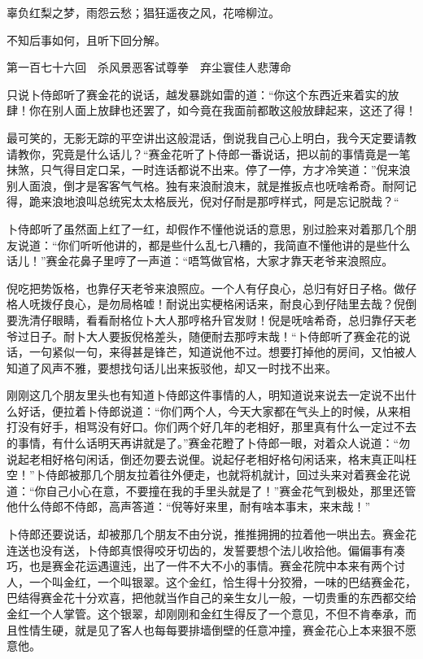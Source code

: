 \documentclass[12pt,UTF8]{ctexbook}
\begin{document}
{{{辜负红梨之梦，雨怨云愁；猖狂遥夜之风，花啼柳泣。

不知后事如何，且听下回分解。





第一百七十六回　杀风景恶客试尊拳　弃尘寰佳人悲薄命





只说卜侍郎听了赛金花的说话，越发暴跳如雷的道：“你这个东西近来着实的放肆！你在别人面上放肆也还罢了，如今竟在我面前都敢这般放肆起来，这还了得！

最可笑的，无影无踪的平空讲出这般混话，倒说我自己心上明白，我今天定要请教请教你，究竟是什么话儿？“赛金花听了卜侍郎一番说话，把以前的事情竟是一笔抹煞，只气得目定口呆，一时连话都说不出来。停了一停，方才冷笑道：”倪来浪别人面浪，倒才是客客气气格。独有来浪耐浪末，就是推扳点也呒啥希奇。耐阿记得，跪来浪地浪叫总统宪太太格辰光，倪对仔耐是那哼样式，阿是忘记脱哉？“

卜侍郎听了虽然面上红了一红，却假作不懂他说话的意思，别过脸来对着那几个朋友说道：“你们听听他讲的，都是些什么乱七八糟的，我简直不懂他讲的是些什么话儿！”赛金花鼻子里哼了一声道：“唔笃做官格，大家才靠天老爷来浪照应。

倪吃把势饭格，也靠仔天老爷来浪照应。一个人有仔良心，总归有好日子格。做仔格人呒拨仔良心，是勿局格嘘！耐说出实梗格闲话来，耐良心到仔陆里去哉？倪倒要洗清仔眼睛，看看耐格位卜大人那哼格升官发财！倪是呒啥希奇，总归靠仔天老爷过日子。耐卜大人要扳倪格差头，随便耐去那哼末哉！“卜侍郎听了赛金花的说话，一句紧似一句，来得甚是锋芒，知道说他不过。想要打掉他的房间，又怕被人知道了风声不雅，要想找句话儿出来扳驳他，却又一时找不出来。

刚刚这几个朋友里头也有知道卜侍郎这件事情的人，明知道说来说去一定说不出什么好话，便拉着卜侍郎说道：“你们两个人，今天大家都在气头上的时候，从来相打没有好手，相骂没有好口。你们两个好几年的老相好，那里真有什么一定过不去的事情，有什么话明天再讲就是了。”赛金花瞪了卜侍郎一眼，对着众人说道：“勿说起老相好格句闲话，倒还勿要去说俚。说起仔老相好格句闲话来，格末真正叫枉空！”卜侍郎被那几个朋友拉着往外便走，也就将机就计，回过头来对着赛金花说道：“你自己小心在意，不要撞在我的手里头就是了！”赛金花气到极处，那里还管他什么侍郎不侍郎，高声答道：“倪等好来里，耐有啥本事末，来末哉！”

卜侍郎还要说话，却被那几个朋友不由分说，推推拥拥的拉着他一哄出去。赛金花连送也没有送，卜侍郎真恨得咬牙切齿的，发誓要想个法儿收拾他。偏偏事有凑巧，也是赛金花运遇邅迍，出了一件不大不小的事情。赛金花院中本来有两个讨人，一个叫金红，一个叫银翠。这个金红，恰生得十分狡猾，一味的巴结赛金花，巴结得赛金花十分欢喜，把他就当作自己的亲生女儿一般，一切贵重的东西都交给金红一个人掌管。这个银翠，却刚刚和金红生得反了一个意见，不但不肯奉承，而且性情生硬，就是见了客人也每每要排墙倒壁的任意冲撞，赛金花心上本来狠不愿意他。

}}}
\end{document}
